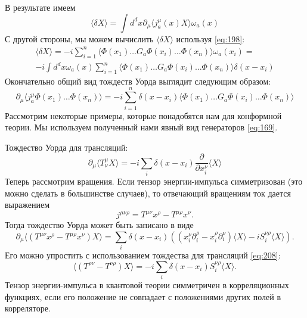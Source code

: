 \documentclass[a4paper,12pt]{article}
\theoremstyle{definition}
\theoremstyle{definition}
\theoremstyle{definition}
\begin{document}
В результате имеем
\begin{equation}
  \label{eq:205}
  \langle \delta X\rangle=\int d^{d}x \partial_{\mu}\langle j^{\mu}_{a}(x) X\rangle \omega_{a}(x)
\end{equation}
С другой стороны, мы можем вычислить $\langle\delta X\rangle$ используя \eqref{eq:198}:
\begin{multline}
  \label{eq:206}
  \langle\delta X\rangle=-i\sum_{i=1}^{n}\langle \Phi(x_{1})\dots G_{a} \Phi(x_{i}) \dots \Phi(x_{n})\rangle \omega_{a}(x_{i})=\\
  -i \int d^{d}x \omega_{a}(x) \sum_{i=1}^{n} \langle \Phi(x_{1}) \dots G_{a} \Phi(x_{i}) \dots \Phi(x_{n})\rangle \delta (x-x_{i})
\end{multline}
Окончательно общий вид тождеств Уорда выглядит следующим образом:
\begin{equation}
  \label{eq:207}
  \partial_{\mu}\langle j^{\mu}_{a}\Phi(x_{1}) \dots \Phi(x_{n})\rangle=-i\sum_{i=1}^{n}\delta (x-x_{i}) \langle\Phi(x_{1})\dots G_{a} \Phi(x_{i})\dots \Phi(x_{n})\rangle
\end{equation}
Рассмотрим некоторые примеры, которые понадобятся нам для конформной теории. Мы используем полученный нами явный вид генераторов \eqref{eq:169}.

Тождество Уорда для трансляций:
\begin{equation}
  \label{eq:208}
  \partial_{\mu}\langle T^{\mu}_{\nu} X\rangle =-i \sum_{i} \delta(x-x_{i}) \frac{\partial}{\partial x_{i}^{\nu}} \langle X \rangle
\end{equation}
Теперь рассмотрим вращения. Если тензор энергии-импульса симметризован (это можно сделать в большинстве случаев), то отвечающий вращениям ток дается выражением
\begin{equation}
  \label{eq:209}
  j^{\mu\nu\rho}=T^{\mu\nu}x^{\rho}-T^{\mu\rho}x^{\nu}.
\end{equation}
Тогда тождество Уорда может быть записано в виде
\begin{equation}
  \label{eq:210}
  \partial_{\mu}\langle (T^{\mu\nu}x^{\rho}-T^{\mu\rho}x^{\nu}) X\rangle=\sum_{i }\delta(x-x_{i}) \left( (x^{\nu}_{i}\partial^{\rho}_{i}-x^{\rho}_{i}\partial^{\nu}_{i})\langle X\rangle-i S^{\nu\rho}_{i}\langle X\rangle\right).
\end{equation}
Его можно упростить с использованием тождества для трансляций \eqref{eq:208}:
\begin{equation}
  \label{eq:211}
  \langle (T^{\rho\nu}-T^{\nu\rho}) X\rangle=-i \sum_{i} \delta(x-x_{i}) S^{\nu\rho}_{i}\langle X\rangle.
\end{equation}
Тензор энергии-импульса в квантовой теории симметричен в корреляционных функциях, если его положение не совпадает с положениями других полей в корреляторе. 
\end{document}
